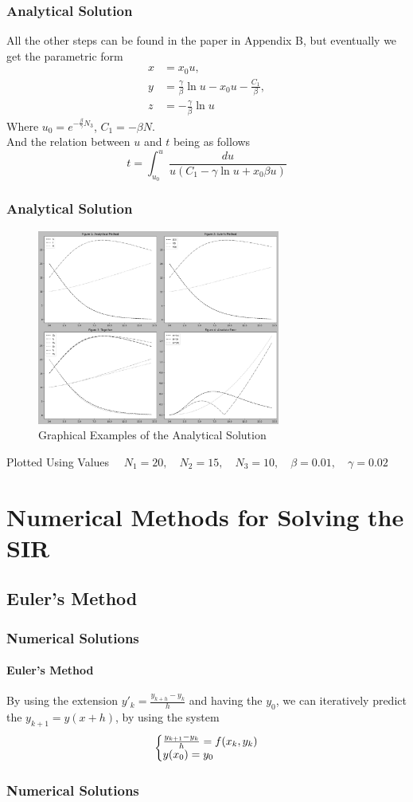 \documentclass{beamer}
\makeatletter
\newenvironment{system}%
{\left\lbrace\begin{array}{@{}l@{}}}%
{\end{array}\right.}
\makeatother
\begin{document}
\begin{frame}\frametitle{Analytical Solution}
    All the other steps can be found in the paper in Appendix B, but eventually we get the parametric form
    \begin{align*}
        x &= x_0u,\\
        y &= \frac{\gamma}{\beta}\ln u - x_0u - \frac{C_1}{\beta},\\
        z &= -\frac{\gamma}{\beta}\ln u
    \end{align*}
Where $u_0 = e^{-\frac{\beta}{\gamma}N_3}$, $C_1 = -\beta N$.\\
And the relation between $u$ and $t$ being as follows
\begin{equation*} 
	t = \int_{u_0}^{u} \frac{du}{u(C_1-\gamma \ln u + x_0\beta u)}
\end{equation*}
\end{frame}
\begin{frame}\frametitle{Analytical Solution}
    \begin{figure}
        \caption{Graphical Examples of the Analytical Solution}
        \centering
        \includegraphics[width=8cm]{Figure_Analitical.png}
    \end{figure}

    Plotted Using Values$\quad$ $N_1=20, \quad N_2=15, \quad N_3=10, \quad \beta = 0.01, \quad \gamma = 0.02$
\end{frame}



\section{Numerical Methods for Solving the SIR}
\subsection{Euler's Method}
\begin{frame}\frametitle{Numerical Solutions}
\framesubtitle  {Euler's Method}
    By using the extension $y'_k=\frac{y_{k+h}-y_k}{h}$ and having the
$y_0$, we can iteratively predict the $y_{k+1}=y(x+h)$, by using the system
\large
\begin{equation*}
    \begin{system}
        \frac{y_{k+1}-y_k}{h}=f(x_k, y_k)
        \\
        y(x_0)=y_0
    \end{system}
\end{equation*}

\end{frame}\frametitle{Numerical Solutions}
\end{document}
